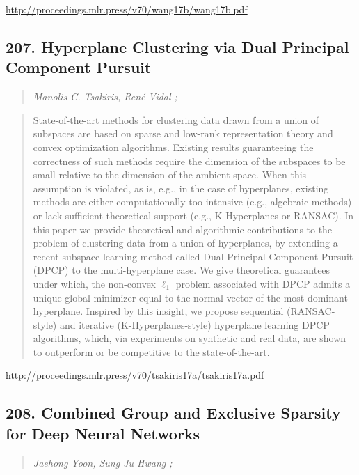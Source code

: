 \documentclass{article}
\begin{document}
\href{http://proceedings.mlr.press/v70/wang17b/wang17b.pdf}{http://proceedings.mlr.press/v70/wang17b/wang17b.pdf}

\subsection{207. Hyperplane Clustering via Dual Principal Component Pursuit}

\begin{quote}
\footnotesize{\textit{Manolis C. Tsakiris, René Vidal ;}}

\end{quote}

\begin{quote}
    State-of-the-art methods for clustering data drawn from a union of subspaces are based on sparse and low-rank representation theory and convex optimization algorithms. Existing results guaranteeing the correctness of such methods require the dimension of the subspaces to be small relative to the dimension of the ambient space. When this assumption is violated, as is, e.g., in the case of hyperplanes, existing methods are either computationally too intensive (e.g., algebraic methods) or lack sufficient theoretical support (e.g., K-Hyperplanes or RANSAC). In this paper we provide theoretical and algorithmic contributions to the problem of clustering data from a union of hyperplanes, by extending a recent subspace learning method called Dual Principal Component Pursuit (DPCP) to the multi-hyperplane case. We give theoretical guarantees under which, the non-convex $\ell_1$ problem associated with DPCP admits a unique global minimizer equal to the normal vector of the most dominant hyperplane. Inspired by this insight, we propose sequential (RANSAC-style) and iterative (K-Hyperplanes-style) hyperplane learning DPCP algorithms, which, via experiments on synthetic and real data, are shown to outperform or be competitive to the state-of-the-art.  
\end{quote}

\href{http://proceedings.mlr.press/v70/tsakiris17a/tsakiris17a.pdf}{http://proceedings.mlr.press/v70/tsakiris17a/tsakiris17a.pdf}

\subsection{208. Combined Group and Exclusive Sparsity for Deep Neural Networks}

\begin{quote}
\footnotesize{\textit{Jaehong Yoon, Sung Ju Hwang ;}}

\end{quote}
\end{document}
